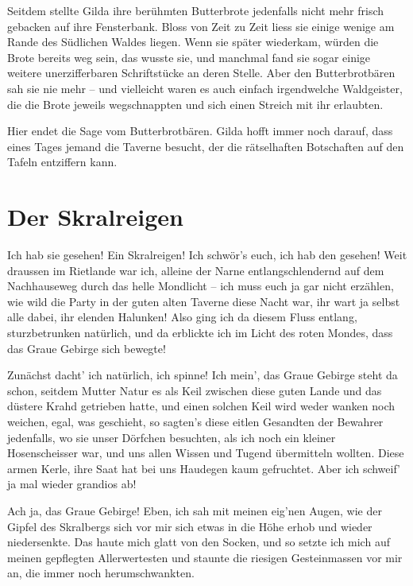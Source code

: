 Seitdem stellte Gilda ihre berühmten Butterbrote jedenfalls nicht mehr frisch gebacken auf ihre Fensterbank. Bloss von Zeit zu Zeit liess sie einige wenige am Rande des Südlichen Waldes liegen. Wenn sie später wiederkam, würden die Brote bereits weg sein, das wusste sie, und manchmal fand sie sogar einige weitere unerzifferbaren Schriftstücke an deren Stelle. Aber den Butterbrotbären sah sie nie mehr – und vielleicht waren es auch einfach irgendwelche Waldgeister, die die Brote jeweils wegschnappten und sich einen Streich mit ihr erlaubten.

Hier endet die Sage vom Butterbrotbären. Gilda hofft immer noch darauf, dass eines Tages jemand die Taverne besucht, der die rätselhaften Botschaften auf den Tafeln entziffern kann.



\newpage
\section{Der Skralreigen}


Ich hab sie gesehen! Ein Skralreigen! Ich schwör’s euch, ich hab den gesehen! Weit draussen im Rietlande war ich, alleine der Narne entlangschlendernd auf dem Nachhauseweg durch das helle Mondlicht – ich muss euch ja gar nicht erzählen, wie wild die Party in der guten alten Taverne diese Nacht war, ihr wart ja selbst alle dabei, ihr elenden Halunken! Also ging ich da diesem Fluss entlang, sturzbetrunken natürlich, und da erblickte ich im Licht des roten Mondes, dass das Graue Gebirge sich bewegte!

Zunächst dacht’ ich natürlich, ich spinne! Ich mein’, das Graue Gebirge steht da schon, seitdem Mutter Natur es als Keil zwischen diese guten Lande und das düstere Krahd getrieben hatte, und einen solchen Keil wird weder wanken noch weichen, egal, was geschieht, so sagten’s diese eitlen Gesandten der Bewahrer jedenfalls, wo sie unser Dörfchen besuchten, als ich noch ein kleiner Hosenscheisser war, und uns allen Wissen und Tugend übermitteln wollten. Diese armen Kerle, ihre Saat hat bei uns Haudegen kaum gefruchtet. Aber ich schweif’ ja mal wieder grandios ab!

Ach ja, das Graue Gebirge! Eben, ich sah mit meinen eig'nen Augen, wie der Gipfel des Skralbergs sich vor mir sich etwas in die Höhe erhob und wieder niedersenkte. Das haute mich glatt von den Socken, und so setzte ich mich auf meinen gepflegten Allerwertesten und staunte die riesigen Gesteinmassen vor mir an, die immer noch herumschwankten.

